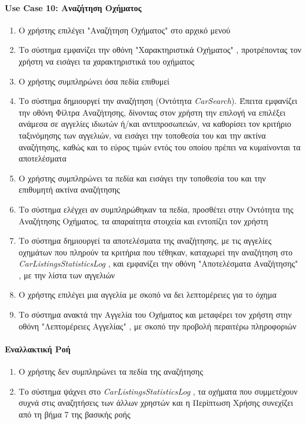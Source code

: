 \documentclass{../ol-softwaremanual}
\begin{document}
	
	\newpage
	\centering
	\paragraph{\en Use Case 10: \gr Αναζήτηση Οχήματος}  
	\begin{enumerate}
		\item Ο χρήστης επιλέγει \en"\gr Αναζήτηση Οχήματος\en" \gr στο αρχικό μενού
		\item Το σύστημα εμφανίζει την οθόνη \en"\gr Χαρακτηριστικά Οχήματος\en" \gr, προτρέποντας τον χρήστη να εισάγει τα χαρακτηριστικά του οχήματος 
		\item Ο χρήστης συμπληρώνει όσα πεδία επιθυμεί
		\item Το σύστημα δημιουργεί την αναζήτηση (Οντότητα \en \textit{CarSearch}\gr). Έπειτα εμφανίζει την οθόνη Φίλτρα Αναζήτησης, δίνοντας στον χρήστη την επιλογή να επιλέξει ανάμεσα σε αγγελίες ιδιωτών ή/και αντιπροσωπειών, να καθορίσει τον κριτήριο ταξινόμησης των αγγελιών, να εισάγει την τοποθεσία του και την ακτίνα αναζήτησης, καθώς και το εύρος τιμών εντός του οποίου πρέπει να κυμαίνονται τα αποτελέσματα
		\item Ο χρήστης συμπληρώνει τα πεδία και εισάγει την τοποθεσία του και την επιθυμητή ακτίνα αναζήτησης
		\item Το σύστημα ελέγχει αν συμπληρώθηκαν τα πεδία, προσθέτει στην Οντότητα της Αναζήτησης Οχήματος, τα απαραίτητα στοιχεία και εντοπίζει τον χρήστη 
		\item Το σύστημα δημιουργεί τα αποτελέσματα της αναζήτησης, με τις αγγελίες οχημάτων που πληρούν τα κριτήρια που τέθηκαν, καταχωρεί την αναζήτηση στο \en \textit{CarListingsStatisticsLog} \gr, και εμφανίζει την οθόνη \en"\gr Αποτελέσματα Αναζήτησης\en" \gr, με την λίστα των αγγελιών 
		\item Ο χρήστης επιλέγει μια αγγελία με σκοπό να δει λεπτομέρειες για το όχημα
		\item Το σύστημα ανακτά την Αγγελία του Οχήματος και μεταφέρει τον χρήστη στην οθόνη \en"\gr Λεπτομέρειες Αγγελίας\en" \gr, με σκοπό την προβολή περαιτέρω πληροφοριών	
	\end{enumerate}
	
	
	\paragraph{Εναλλακτική Ροή}
	\begin{enumerate}
		\item Ο χρήστης δεν συμπληρώνει τα πεδία της αναζήτησης
		\item Το σύστημα ψάχνει στο \en \textit{CarListingsStatisticsLog} \gr, τα οχήματα που συμμετέχουν συχνά στις αναζητήσεις των άλλων χρηστών και η Περίπτωση Χρήσης συνεχίζει από τη βήμα 7 της βασικής ροής
	\end{enumerate}
	
\end{document}
